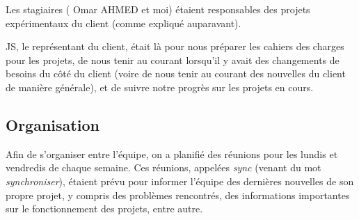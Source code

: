 \begin{flushleft}
  Les stagiaires (\sccad{} Omar AHMED et moi) étaient responsables
  des projets expérimentaux du client (comme expliqué auparavant).
\end{flushleft}

\begin{flushleft}
  JS, le représentant du client, était là pour nous préparer les
  cahiers des charges pour les projets, de nous tenir au courant
  lorsqu'il y avait des changements de besoins du côté du client
  (voire de nous tenir au courant des nouvelles du client de manière
  générale), et de suivre notre progrès sur les projets en cours.
\end{flushleft}

\subsection*{Organisation}

\begin{flushleft}
  Afin de s'organiser entre l'équipe, on a planifié des réunions
  pour les lundis et vendredis de chaque semaine. Ces réunions,
  appelées \textit{sync} (venant du mot \textit{synchroniser}),
  étaient prévu pour informer l'équipe des dernières nouvelles de son
  propre projet, y compris des problèmes rencontrés, des informations
  importantes sur le fonctionnement des projets, entre autre.
\end{flushleft}
